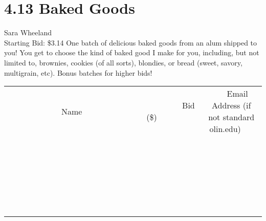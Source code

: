 \documentclass[11pt]{article}
\begin{document}
\section*{4.13 Baked Goods}
Sara Wheeland
\\
Starting Bid: \$3.14
\newline
One batch of delicious baked goods from an alum shipped to you!  You get to choose the kind of baked good I make for you, including, but not limited to, brownies, cookies (of all sorts), blondies, or bread (sweet, savory, multigrain, etc).  Bonus batches for higher bids!
\\[6ex]
\begin{tabular}{c c c}
~~~~~~~~~~~~~Name~~~~~~~~~~~~~ & ~~~~~~~~~Bid (\$)~~~~~~~~~  & ~~~Email Address (if not standard olin.edu)~~~\\
 & & \\
\hline
 & & \\
\hline
 & & \\
\hline
 & & \\
\hline
 & & \\
\hline
 & & \\
\hline
 & & \\
\hline
 & & \\
\hline
 & & \\
\hline
 & & \\
\hline
 & & \\
\hline
 & & \\
\hline
 & & \\
\hline
 & & \\
\hline
 & & \\
\hline
 & & \\
\hline
 & & \\
\hline
 & & \\
\hline
 & & \\
\hline
 & & \\
\hline
 & & \\
\hline
 & & \\
\hline
 & & \\
\hline
 & & \\
\hline
 & & \\
\hline
 & & \\
\hline
\end{tabular}
\newpage
\end{document}
